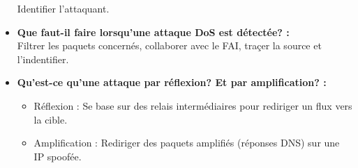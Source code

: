 \documentclass{report}
\begin{document}
\begin{itemize}
					Identifier l'attaquant.\\

				\item \textbf{Que faut-il faire lorsqu'une attaque DoS est détectée? : }\\

					Filtrer les paquets concernés, collaborer avec le FAI, traçer la source et l'indentifier.\\

				\item \textbf{Qu'est-ce qu'une attaque par réflexion? Et par amplification? :}\\

					\begin{itemize}
						\item Réflexion : Se base sur des relais intermédiaires pour rediriger un flux vers la cible.
						\item Amplification : Rediriger des paquets amplifiés (réponses DNS) sur une IP spoofée.
					\end{itemize}

			\end{itemize}
\end{document}

